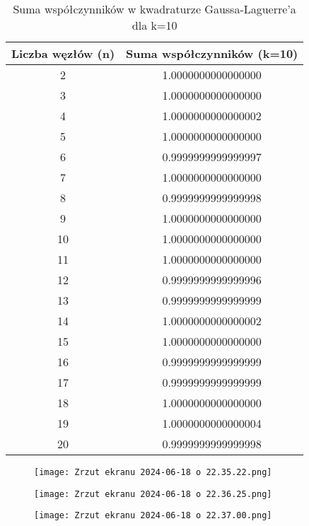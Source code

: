 \documentclass{article}
\begin{document}
\begin{table}[h!]
\centering
\begin{tabular}{cc}
\toprule
Liczba węzłów (n) & Suma współczynników (k=10) \\
\midrule
2  & 1.0000000000000000 \\
3  & 1.0000000000000000 \\
4  & 1.0000000000000002 \\
5  & 1.0000000000000000 \\
6  & 0.9999999999999997 \\
7  & 1.0000000000000000 \\
8  & 0.9999999999999998 \\
9  & 1.0000000000000000 \\
10 & 1.0000000000000000 \\
11 & 1.0000000000000000 \\
12 & 0.9999999999999996 \\
13 & 0.9999999999999999 \\
14 & 1.0000000000000002 \\
15 & 1.0000000000000000 \\
16 & 0.9999999999999999 \\
17 & 0.9999999999999999 \\
18 & 1.0000000000000000 \\
19 & 1.0000000000000004 \\
20 & 0.9999999999999998 \\
\bottomrule
\end{tabular}
\caption{Suma współczynników w kwadraturze Gaussa-Laguerre'a dla k=10}
\label{tab:coeff_k10}
\end{table}

\clearpage
\newpage
\begin{figure}[H]
    \centering
    \texttt{[image: Zrzut ekranu 2024-06-18 o 22.35.22.png]}
    \caption*{}
    \label{fig:enter-label}
\end{figure}

\begin{figure}[H]
    \centering
    \texttt{[image: Zrzut ekranu 2024-06-18 o 22.36.25.png]}
    \caption*{}
    \label{fig:enter-label}
\end{figure}

\begin{figure}[H]
    \centering
    \texttt{[image: Zrzut ekranu 2024-06-18 o 22.37.00.png]}
    \caption*{}
    \label{fig:enter-label}
\end{figure}
\end{document}
